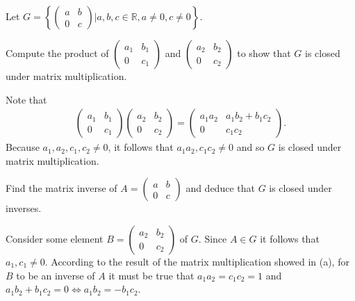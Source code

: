\documentclass[12pt]{article}
\newcommand{\R}{\mathbb{R}}
\newenvironment{problem}[2][Problem]{\begin{trivlist} \item[\hskip \labelsep {\bfseries #1}\hskip \labelsep {\bfseries #2.}]}{\end{trivlist}}
\newenvironment{solution}[1][Solution]{\begin{trivlist} \item[\hskip \labelsep {\bfseries #1}]}{\end{trivlist}}
\begin{document}
\begin{problem}{10}
  Let $G=\left\{ \begin{pmatrix} a& b\\ 0 & c\end{pmatrix}| a,b,c\in\R,a\neq 0, c\neq 0\right\}$.
\begin{enumerate}
  \item Compute the product of $\begin{pmatrix}a_{1} & b_{1}\\ 0 & c_{1}\end{pmatrix}$ and $\begin{pmatrix}a_{2} & b_{2} \\ 0 & c_{2}\end{pmatrix}$ to show that $G$ is closed under matrix multiplication.
\begin{solution}
  Note that 
\begin{align*}
  \begin{pmatrix}a_{1} & b_{1}\\ 0 & c_{1}\end{pmatrix} \begin{pmatrix} a_{2} & b_{2} \\ 0 & c_{2}\end{pmatrix} = \begin{pmatrix} a_{1}a_{2} & a_{1}b_{2} + b_{1}c_{2}\\ 0 & c_{1}c_{2}\end{pmatrix}.
\end{align*}
Because $a_{1},a_{2},c_{1},c_{2}\neq 0$, it follows that $a_{1}a_{2},c_{1}c_{2}\neq 0$ and so $G$ is closed under matrix multiplication.
\end{solution}
  \item Find the matrix inverse of $A=\begin{pmatrix}a & b\\ 0 & c\end{pmatrix}$ and deduce that $G$ is closed under inverses.
\begin{solution}
  Consider some element $B=\begin{pmatrix}a_{2} & b_{2}\\ 0 & c_{2} \end{pmatrix}$ of $G$. Since $A\in G$ it follows that $a_{1},c_{1}\neq 0$. According to the result of the matrix multiplication showed in (a), for $B$ to be an inverse of $A$ it must be true that $a_{1}a_{2} = c_{1}c_{2} = 1$ and $a_{1}b_{2}+b_{1}c_{2} = 0\iff a_{1}b_{2} = -b_{1}c_{2}$. \\


\end{solution}
\end{enumerate}
\end{problem}
\end{document}
